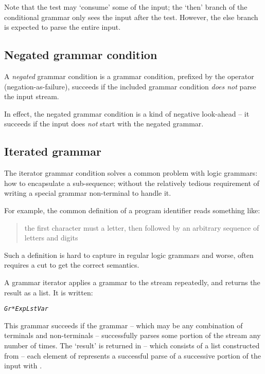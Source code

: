 Note that the test may `consume' some of the input; the `then' branch of the conditional grammar only sees the input after the test. However, the else branch is expected to parse the entire input.

\subsection{Negated grammar condition}
\label{grammar:negation}

A \emph{negated} grammar condition is a grammar condition, prefixed by the \nasf operator (negation-as-failure), succeeds if the included grammar condition \emph{does not} parse the input stream.

In effect, the negated grammar condition is a kind of negative look-ahead -- it succeeds if the input does \emph{not} start with the negated grammar.


\subsection{Iterated grammar}
\label{grammar:iterator}
The iterator grammar condition solves a common problem with logic grammars: how to encapsulate a sub-sequence; without the relatively tedious requirement of writing a special grammar non-terminal to handle it.

For example, the common definition of a program identifier reads something like:
\begin{quote}
the first character must a letter, then followed by an arbitrary sequence of letters and digits
\end{quote}
Such a definition is hard to capture in regular logic grammars and worse, often requires a cut to get the correct semantics.

A grammar iterator applies a grammar to the stream repeatedly, and returns the result as a list. It is written:
\begin{alltt}
\emph{Gr} * \emph{Exp} \uphat \emph{LstVar}
\end{alltt}
This grammar succeeds if the grammar  -- which may be any combination of terminals and non-terminals -- successfully parses some portion of the stream any number of times. The `result' is returned in  -- which consists of a list constructed from  -- each element of  represents a successful parse of a successive portion of the input with .

